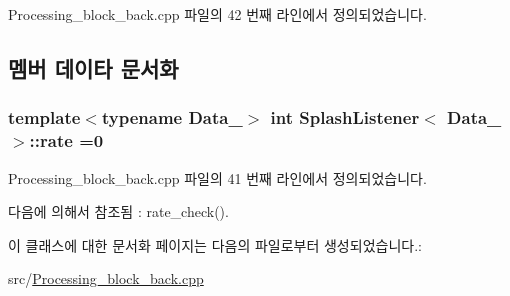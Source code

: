 Processing\+\_\+block\+\_\+back.\+cpp 파일의 42 번째 라인에서 정의되었습니다.



\subsection{멤버 데이타 문서화}
\subsubsection[{\texorpdfstring{rate}{rate}}]{\setlength{\rightskip}{0pt plus 5cm}template$<$typename Data\+\_$>$ int {\bf Splash\+Listener}$<$ Data\+\_ $>$\+::rate =0}\hypertarget{classSplashListener_ad9586539ca2d53ae582894ecce597583}{}\label{classSplashListener_ad9586539ca2d53ae582894ecce597583}


Processing\+\_\+block\+\_\+back.\+cpp 파일의 41 번째 라인에서 정의되었습니다.



다음에 의해서 참조됨 \+:  rate\+\_\+check().



이 클래스에 대한 문서화 페이지는 다음의 파일로부터 생성되었습니다.\+:\begin{DoxyCompactItemize}
\item 
src/\hyperlink{Processing__block__back_8cpp}{Processing\+\_\+block\+\_\+back.\+cpp}\end{DoxyCompactItemize}
